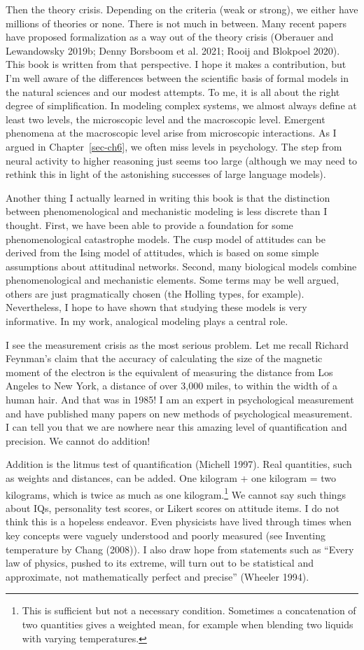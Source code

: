 \documentclass[
  a4paper,
  DIV=11,
  numbers=noendperiod,
  oneside]{scrreprt}
\begin{document}
Then the theory crisis. Depending on the criteria (weak or strong), we
either have millions of theories or none. There is not much in between.
Many recent papers have proposed formalization as a way out of the
theory crisis (Oberauer and Lewandowsky 2019b; Denny Borsboom et al.
2021; Rooij and Blokpoel 2020). This book is written from that
perspective. I hope it makes a contribution, but I'm well aware of the
differences between the scientific basis of formal models in the natural
sciences and our modest attempts. To me, it is all about the right
degree of simplification. In modeling complex systems, we almost always
define at least two levels, the microscopic level and the macroscopic
level. Emergent phenomena at the macroscopic level arise from
microscopic interactions. As I argued in Chapter~\ref{sec-ch6}, we often
miss levels in psychology. The step from neural activity to higher
reasoning just seems too large (although we may need to rethink this in
light of the astonishing successes of large language models).

Another thing I actually learned in writing this book is that the
distinction between phenomenological and mechanistic modeling is less
discrete than I thought. First, we have been able to provide a
foundation for some phenomenological catastrophe models. The cusp model
of attitudes can be derived from the Ising model of attitudes, which is
based on some simple assumptions about attitudinal networks. Second,
many biological models combine phenomenological and mechanistic
elements. Some terms may be well argued, others are just pragmatically
chosen (the Holling types, for example). Nevertheless, I hope to have
shown that studying these models is very informative. In my work,
analogical modeling plays a central role.

I see the measurement crisis as the most serious problem. Let me recall
Richard Feynman's claim that the accuracy of calculating the size of the
magnetic moment of the electron is the equivalent of measuring the
distance from Los Angeles to New York, a distance of over 3,000 miles,
to within the width of a human hair. And that was in 1985! I am an
expert in psychological measurement and have published many papers on
new methods of psychological measurement. I can tell you that we are
nowhere near this amazing level of quantification and precision. We
cannot do addition!

Addition is the litmus test of quantification (Michell 1997). Real
quantities, such as weights and distances, can be added. One kilogram +
one kilogram = two kilograms, which is twice as much as one
kilogram.\footnote{This is sufficient but not a necessary condition.
  Sometimes a concatenation of two quantities gives a weighted mean, for
  example when blending two liquids with varying temperatures.} We
cannot say such things about IQs, personality test scores, or Likert
scores on attitude items. I do not think this is a hopeless endeavor.
Even physicists have lived through times when key concepts were vaguely
understood and poorly measured (see Inventing temperature by Chang
(2008)). I also draw hope from statements such as ``Every law of
physics, pushed to its extreme, will turn out to be statistical and
approximate, not mathematically perfect and precise'' (Wheeler 1994).
\end{document}
